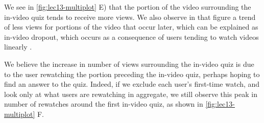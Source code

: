 \documentclass{sigchi}
\begin{document}
We see in \autoref{fig:lec13-multiplot} E) that the portion of the video surrounding the in-video quiz tends to receive more views. We also observe in that figure a trend of less views for portions of the video that occur later, which can be explained as in-video dropout, which occurs as a consequence of users tending to watch videos linearly \cite{juho}.

We believe the increase in number of views surrounding the in-video quiz is due to the user rewatching the portion preceding the in-video quiz, perhaps hoping to find an answer to the quiz. Indeed, if we exclude each user's first-time watch, and look only at what users are rewatching in aggregate, we still observe this peak in number of rewatches around the first in-video quiz, as shown in \autoref{fig:lec13-multiplot} F. %


\end{document}
